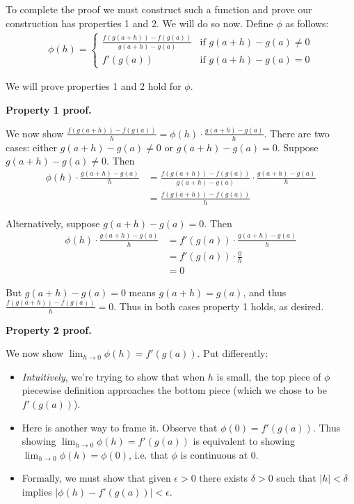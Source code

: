 To complete the proof we must construct such a function and prove our
construction has properties 1 and 2. We will do so now. Define $\phi$ as
follows:
\begin{align*}
  \phi(h)=\begin{cases}
    \frac{f(g(a+h))-f(g(a))}{g(a+h)-g(a)} & \text{if } g(a+h)-g(a)\neq0 \\
    f'(g(a))  & \text{if } g(a+h)-g(a)=0
\end{cases}
\end{align*}

We will prove properties 1 and 2 hold for $\phi$.

\vs

\textbf{Property 1 proof.}

We now show
$\frac{f(g(a+h))-f(g(a))}{h}=\phi(h)\cdot\frac{g(a+h)-g(a)}{h}$. There are
two cases: either $g(a+h)-g(a)\neq0$ or $g(a+h)-g(a)=0$. Suppose
$g(a+h)-g(a)\neq0$. Then
\begin{align*}
  \phi(h)\cdot\frac{g(a+h)-g(a)}{h}&=\frac{f(g(a+h))-f(g(a))}{g(a+h)-g(a)}\cdot\frac{g(a+h)-g(a)}{h}\\
                            &=\frac{f(g(a+h))-f(g(a))}{h}
\end{align*}

Alternatively, suppose $g(a+h)-g(a)=0$. Then
\begin{align*}
  \phi(h)\cdot\frac{g(a+h)-g(a)}{h}&=f'(g(a))\cdot\frac{g(a+h)-g(a)}{h}\\
                            &=f'(g(a))\cdot\frac{0}{h}\\
                            &=0
\end{align*}

But $g(a+h)-g(a)=0$ means $g(a+h)=g(a)$, and thus
$\frac{f(g(a+h))-f(g(a))}{h}=0$. Thus in both cases property 1 holds,
as desired.

\vs

\textbf{Property 2 proof.}

We now show $\lim_{h\to0}\phi(h)=f'(g(a))$. Put differently:
\begin{itemize}
\item \textit{Intuitively}, we're trying to show that when $h$ is
  small, the top piece of $\phi$ piecewise definition approaches the
  bottom piece (which we chose to be $f'(g(a))$).
\item Here is another way to frame it. Observe that
  $\phi(0)=f'(g(a))$. Thus showing $\lim_{h\to0}\phi(h)=f'(g(a))$ is
  equivalent to showing $\lim_{h\to0}\phi(h)=\phi(0)$, i.e. that
  $\phi$ is continuous at $0$.
\item Formally, we must show that given $\epsilon>0$ there exists
  $\delta>0$ such that $|h|<\delta$ implies $|\phi(h)-f'(g(a))|<\epsilon$.
\end{itemize}

